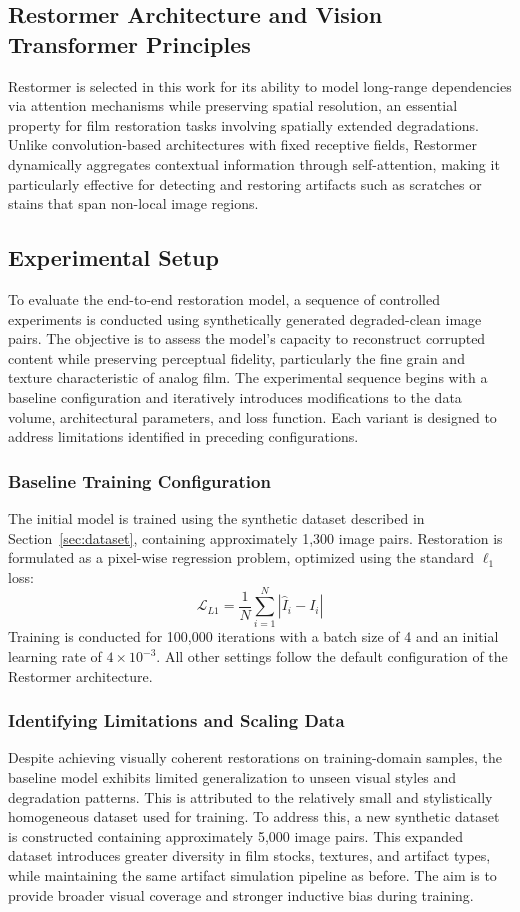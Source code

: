 \documentclass[10pt,a4paper,twocolumn,twoside]{article}
\begin{document}
\subsection{Restormer Architecture and Vision Transformer Principles}
Restormer \cite{restormer} is selected in this work for its ability to model long-range dependencies via attention mechanisms while preserving spatial resolution, an essential property for film restoration tasks involving spatially extended degradations. Unlike convolution-based architectures with fixed receptive fields, Restormer dynamically aggregates contextual information through self-attention, making it particularly effective for detecting and restoring artifacts such as scratches or stains that span non-local image regions.
\subsection{Experimental Setup}
To evaluate the end-to-end restoration model, a sequence of controlled experiments is conducted using synthetically generated degraded-clean image pairs. The objective is to assess the model's capacity to reconstruct corrupted content while preserving perceptual fidelity, particularly the fine grain and texture characteristic of analog film. The experimental sequence begins with a baseline configuration and iteratively introduces modifications to the data volume, architectural parameters, and loss function. Each variant is designed to address limitations identified in preceding configurations.
\subsubsection{Baseline Training Configuration}
The initial model is trained using the synthetic dataset described in Section~\ref{sec:dataset}, containing approximately 1,300 image pairs. Restoration is formulated as a pixel-wise regression problem, optimized using the standard $\ell_1$ loss:
\begin{equation*}
\mathcal{L}_{L1} = \dfrac{1}{N} \sum_{i=1}^{N} \left| \hat{I}_i - I_i \right|
\end{equation*}
Training is conducted for 100{,}000 iterations with a batch size of 4 and an initial learning rate of $4 \times 10^{-3}$. All other settings follow the default configuration of the Restormer architecture.
\subsubsection{Identifying Limitations and Scaling Data}
Despite achieving visually coherent restorations on training-domain samples, the baseline model exhibits limited generalization to unseen visual styles and degradation patterns. This is attributed to the relatively small and stylistically homogeneous dataset used for training. To address this, a new synthetic dataset is constructed containing approximately 5,000 image pairs. This expanded dataset introduces greater diversity in film stocks, textures, and artifact types, while maintaining the same artifact simulation pipeline as before. The aim is to provide broader visual coverage and stronger inductive bias during training.
\end{document}
